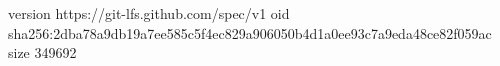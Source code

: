 version https://git-lfs.github.com/spec/v1
oid sha256:2dba78a9db19a7ee585c5f4ec829a906050b4d1a0ee93c7a9eda48ce82f059ac
size 349692
